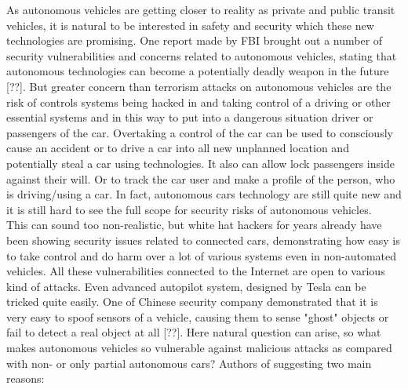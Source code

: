As autonomous vehicles are getting closer to reality as private and public transit vehicles, it is natural to be interested in safety and security which these new technologies are promising. One report made by FBI brought out a number of security vulnerabilities and concerns related to autonomous vehicles, stating that autonomous technologies can become a potentially deadly weapon in the future [??]. But greater concern than terrorism attacks on autonomous vehicles are the risk of controls systems being hacked in and taking control of a driving or other essential systems and in this way to put into a dangerous situation driver or passengers of the car. Overtaking a control of the car can be used to consciously cause an accident or to drive a car into all new unplanned location and potentially steal a car using technologies. It also can allow lock passengers inside against their will. Or to track the car user and make a profile of the person, who is driving/using a car. In fact, autonomous cars technology are still quite new and it is still hard to see the full scope for security risks of autonomous vehicles. \\
This can sound too non-realistic, but white hat hackers for years already have been showing security issues related to connected cars, demonstrating how easy is to take control and do harm over a lot of various systems even in non-automated vehicles. All these vulnerabilities connected to the Internet are open to various kind of attacks. Even advanced autopilot system, designed by Tesla can be tricked quite easily. One of Chinese security company demonstrated that it is very easy to spoof sensors of a vehicle, causing them to sense "ghost" objects or fail to detect a real object at all [??].
Here natural question can arise, so what makes autonomous vehicles so vulnerable against malicious attacks as compared with non- or only partial autonomous cars? Authors of \cite{sec} suggesting two main reasons:
